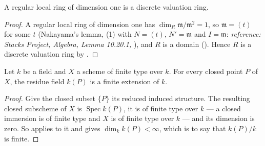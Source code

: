 \begin{lemma}
\label{lem:pcb-regular-dim1-dvr}
A regular local ring of dimension one is a discrete valuation ring.
\end{lemma}
\begin{proof}
A regular local ring of dimension one has
\(\dim_R\mathfrak m/\mathfrak m^2=1\), so \(\mathfrak m=(t)\) for
some \(t\) (Nakayama's lemma, (1) with
\(N=(t)\), \(N'=\mathfrak m\) and \(I=\mathfrak m\):
\emph{reference: Stacks Project,
Algebra, Lemma 10.20.1, }), and \(R\) is a domain
().  Hence \(R\) is a discrete
valuation ring by .
\end{proof}

\begin{lemma}
\label{lem:pcb-closed-point-residue-finite}
Let \(k\) be a field and \(X\) a scheme of finite type over \(k\).  For
every closed point \(P\) of \(X\), the residue field \(k(P)\) is a
finite extension of \(k\).
\end{lemma}
\begin{proof}
Give the closed subset \(\{P\}\) its reduced induced structure.  The
resulting closed subscheme of \(X\) is \(\operatorname{Spec}k(P)\), it is
of finite type over \(k\) --- a closed immersion is of finite type and
\(X\) is of finite type over \(k\) --- and its dimension is zero.  So
 applies to it and gives
\(\dim_kk(P)<\infty\), which is to say that \(k(P)/k\) is finite.
\end{proof}

